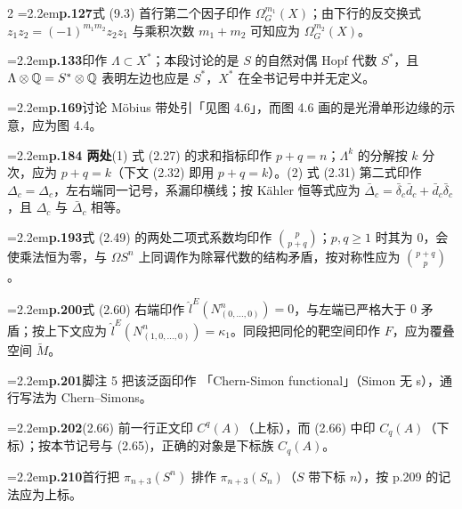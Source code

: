 \begin{multicols}{2}
\noindent\hangindent=2.2em\textbf{p.127}\quad 式 (9.3) 首行第二个因子印作 $\Omega_G^{m_1}(X)$；由下行的反交换式 $z_1z_2=(-1)^{m_1m_2}z_2z_1$ 与乘积次数 $m_1+m_2$ 可知应为 $\Omega_G^{m_2}(X)$。\par

\noindent\hangindent=2.2em\textbf{p.133}\quad 印作 $\Lambda\subset X^*$；本段讨论的是 $S$ 的自然对偶 Hopf 代数 $S^*$，且 $\Lambda\otimes\mathbb{Q}=S^*\otimes\mathbb{Q}$ 表明左边也应是 $S^*$，$X^*$ 在全书记号中并无定义。\par

\noindent\hangindent=2.2em\textbf{p.169}\quad 讨论 Möbius 带处引「见图 4.6」，而图 4.6 画的是光滑单形边缘的示意，应为图 4.4。\par

\noindent\hangindent=2.2em\textbf{p.184 两处}\quad (1) 式 (2.27) 的求和指标印作 $p+q=n$；$\Lambda^k$ 的分解按 $k$ 分次，应为 $p+q=k$（下文 (2.32) 即用 $p+q=k$）。(2) 式 (2.31) 第二式印作 $\Delta_c=\Delta_c$，左右端同一记号，系漏印横线；按 Kähler 恒等式应为 $\bar\Delta_c=\bar\delta_c\bar d_c+\bar d_c\bar\delta_c$，且 $\Delta_c$ 与 $\bar\Delta_c$ 相等。\par

\noindent\hangindent=2.2em\textbf{p.193}\quad 式 (2.49) 的两处二项式系数均印作 $\binom{p}{p+q}$；$p,q\ge1$ 时其为 $0$，会使乘法恒为零，与 $\Omega S^n$ 上同调作为除幂代数的结构矛盾，按对称性应为 $\binom{p+q}{p}$。\par

\noindent\hangindent=2.2em\textbf{p.200}\quad 式 (2.60) 右端印作 $\hat l^E(N^n_{(0,\dots,0)})=0$，与左端已严格大于 $0$ 矛盾；按上下文应为 $\hat l^E(N^n_{(1,0,\dots,0)})=\kappa_1$。同段把同伦的靶空间印作 $F$，应为覆叠空间 $\tilde M$。\par

\noindent\hangindent=2.2em\textbf{p.201}\quad 脚注 5 把该泛函印作 「Chern-Simon functional」（Simon 无 s），通行写法为 Chern--Simons。\par

\noindent\hangindent=2.2em\textbf{p.202}\quad (2.66) 前一行正文印 $C^q(A)$（上标），而 (2.66) 中印 $C_q(A)$（下标）；按本节记号与 (2.65)，正确的对象是下标族 $C_q(A)$。\par

\noindent\hangindent=2.2em\textbf{p.210}\quad 首行把 $\pi_{n+3}(S^n)$ 排作 $\pi_{n+3}(S_n)$（$S$ 带下标 $n$），按 p.209 的记法应为上标。\par


\end{multicols}
